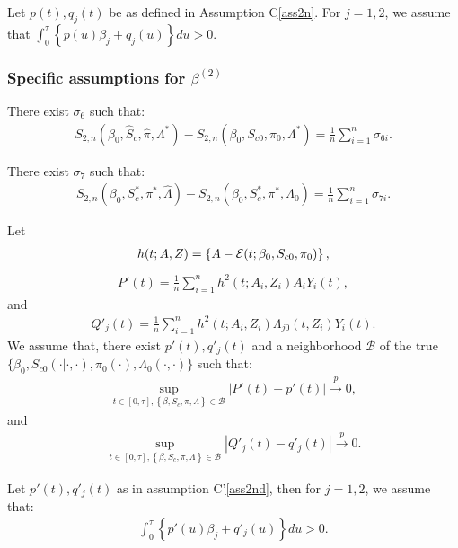 \documentclass[11pt]{article}
\newcommand{\eqnn}{\begin{eqnarray*}}
\newcommand{\een}{\end{eqnarray*}}
\begin{document}
\begin{assumptionC}\label{ass5n}
Let $p(t),q_j(t)$ be as defined in Assumption C\ref{ass2n}. For $j=1,2$, we assume that
$\int_0^\tau  \left\{p(u)\beta_j + q_j(u)\right\}du>0$.
\end{assumptionC}





\subsubsection{Specific assumptions for $\beta^{(2)}$}

\begin{assumptionA'}\label{ifD}
There exist $\sigma_6$ such that: 
\eqnn
{S}_{2,n}({\beta}_0, \hat S_c, \hat \pi,\Lambda^{*})-{S}_{2,n}({\beta}_0, S_{c0}, \pi_0, \Lambda^{*})=\frac{1}{n}\sum_{i=1}^n \sigma_{6i}.
\een
\end{assumptionA'}

\begin{assumptionB'}\label{ifE}
There exist $\sigma_7$ such that: 
\eqnn
{S}_{2,n}({\beta}_0, S^{*}_c,  \pi^{*} ,\hat \Lambda)-{S}_{2,n}({\beta}_0, S^{*}_{c}, \pi^{*}, \Lambda_0)=\frac{1}{n}\sum_{i=1}^n \sigma_{7i}.
\een
\end{assumptionB'}



\begin{assumptionC'}\label{ass2nd}
Let
\eqnn
h(t; A,Z)= \left\{A -{\cal E}(t; \beta_0, S_{c0}, \pi_0)\right\},
\een
\eqnn
P'(t)=\frac{1}{n}\sum_{i=1}^n h^2(t; A_i, Z_i) A_iY_i(t),
\een
and
\eqnn
Q'_j(t)=\frac{1}{n}\sum_{i=1}^n h^2(t; A_i, Z_i)\Lambda_{j0}(t, Z_i)Y_i(t).
\een
We assume that, there exist $p'(t),q'_j(t)$ and a neighborhood $\mathcal{B}$ of the true \\$\{\beta_0, S_{c0}(\cdot | \cdot,\cdot), \pi_0(\cdot), \Lambda_{0}(\cdot,\cdot)\}$ such that:
\eqnn
\sup_{t \in [0,\tau], \left\{\beta, S_c, \pi, \Lambda\right\} \in \mathcal{B}} \left|P'(t)-p'(t)\right|\overset{p}{\rightarrow} 0,\een
and
\eqnn
\sup_{t \in [0,\tau], \left\{\beta,S_c, \pi, \Lambda\right\} \in \mathcal{B}} \left|Q'_j(t)-q'_j(t)\right|\overset{p}{\rightarrow} 0.\een
\end{assumptionC'}


\begin{assumptionC'}\label{ass5nd}
Let $p'(t),q'_j(t)$ as in assumption C'\ref{ass2nd}, then for $j=1,2$, we assume that: 
\eqnn
\int_0^\tau  \left\{p'(u)\beta_j + q'_j(u)\right\}du>0.
\een
\end{assumptionC'}
\end{document}
